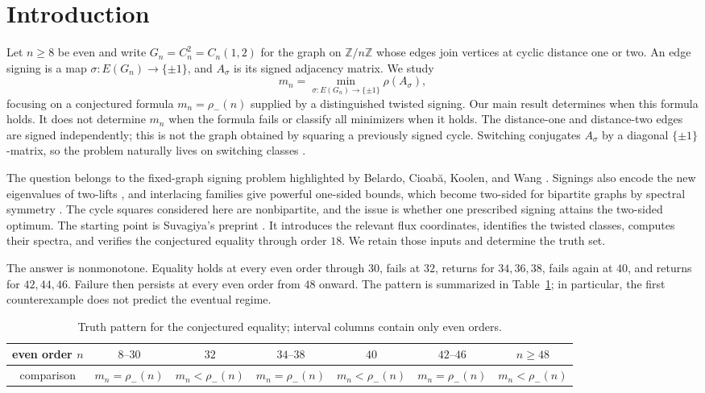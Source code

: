 \section{Introduction}\label{sec:introduction}

Let \(n\geq8\) be even and write \(G_n=C_n^2=C_n(1,2)\) for the graph on
\(\mathbb Z/n\mathbb Z\) whose edges join vertices at cyclic distance one or
two. An edge signing is a map
\(\sigma:E(G_n)\to\{\pm1\}\), and \(A_\sigma\) is its signed adjacency
matrix. We study
\[
m_n=\min_{\sigma:E(G_n)\to\{\pm1\}}\rho(A_\sigma),
\]
focusing on a conjectured formula \(m_n=\rho_-(n)\) supplied by a
distinguished twisted signing. Our main result determines when this
formula holds. It does not determine \(m_n\) when the formula fails or
classify all minimizers when it holds. The distance-one and distance-two
edges are signed independently; this is not the graph obtained by squaring
a previously signed cycle. Switching conjugates \(A_\sigma\) by a diagonal
\(\{\pm1\}\)-matrix, so the problem naturally lives on switching classes
\cite{Zaslavsky1982}.

The question belongs to the fixed-graph signing problem highlighted by
Belardo, Cioab\u{a}, Koolen, and Wang
\cite{BelardoCioabaKoolenWang2019}. Signings also encode the new eigenvalues
of two-lifts \cite{BiluLinial2006}, and interlacing families give powerful
one-sided bounds, which become two-sided for bipartite graphs by spectral
symmetry \cite{MarcusSpielmanSrivastava2015}. The cycle squares considered
here are nonbipartite, and the issue is whether one prescribed signing
attains the two-sided optimum. The starting point is Suvagiya's
preprint \cite[Conjecture~3]{Suvagiya2026Signed}. It introduces the relevant
flux coordinates, identifies the twisted classes, computes their spectra,
and verifies the conjectured equality through order \(18\). We retain those
inputs and determine the truth set.

The answer is nonmonotone. Equality holds at every even order through \(30\),
fails at \(32\), returns for \(34,36,38\), fails again at \(40\), and returns
for \(42,44,46\). Failure then persists at every even order from \(48\)
onward. The pattern is summarized in Table~\ref{tab:truth-pattern}; in
particular, the first counterexample does not predict the eventual regime.

\begin{table}[t]
\centering
\small
\begin{tabular}{c@{\qquad}cccccc}
\toprule
even order \(n\)&\(8\text{--}30\)&\(32\)&\(34\text{--}38\)&\(40\)&\(42\text{--}46\)&\(n\geq48\)\\
\midrule
comparison&\(m_n=\rho_-(n)\)&\(m_n<\rho_-(n)\)&\(m_n=\rho_-(n)\)&\(m_n<\rho_-(n)\)&\(m_n=\rho_-(n)\)&\(m_n<\rho_-(n)\)\\
\bottomrule
\end{tabular}
\caption{Truth pattern for the conjectured equality; interval columns contain
only even orders.}
\label{tab:truth-pattern}
\end{table}


